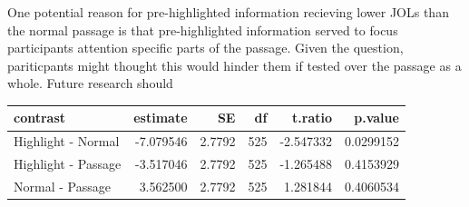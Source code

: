 \documentclass[doc]{apa6}
\begin{document}
One potential reason for pre-highlighted information recieving lower JOLs than the normal passage is that pre-highlighted information served to focus participants attention specific parts of the passage. Given the question, pariticpants might thought this would hinder them if tested over the passage as a whole. Future research should

\begin{tabular}{l|r|r|r|r|r}
\hline
contrast & estimate & SE & df & t.ratio & p.value\\
\hline
Highlight - Normal & -7.079546 & 2.7792 & 525 & -2.547332 & 0.0299152\\
\hline
Highlight - Passage & -3.517046 & 2.7792 & 525 & -1.265488 & 0.4153929\\
\hline
Normal - Passage & 3.562500 & 2.7792 & 525 & 1.281844 & 0.4060534\\
\hline
\end{tabular}
\end{document}
